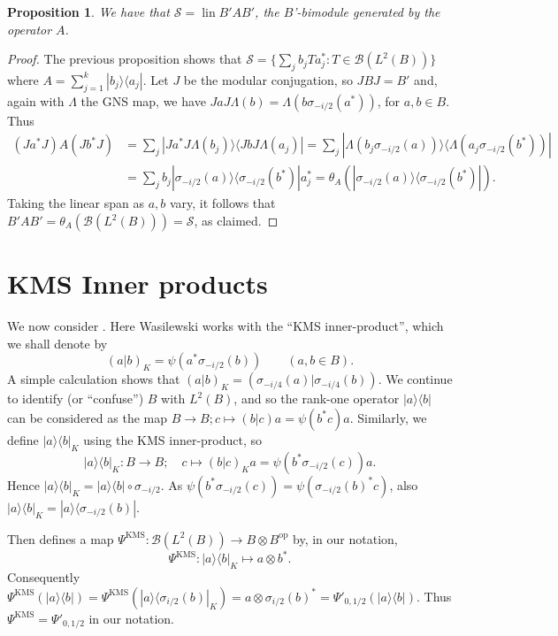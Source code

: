 \documentclass[a4paper,11pt]{article}
\theoremstyle{plain}
\newtheorem{proposition}{Proposition}[section]
\theoremstyle{remark}
\newcommand{\mc}[1]{\mathcal{#1}}
\newcommand{\lin}{\operatorname{lin}}
\newcommand{\op}{{\operatorname{op}}}
\newcommand{\KMS}{\textrm{KMS}}
\begin{document}
\begin{proposition}\label{prop:S_is_bimod_A}
We have that $\mc S = \lin B' A B'$, the $B$'-bimodule generated by the operator $A$.
\end{proposition}
\begin{proof}
The previous proposition shows that $\mc S = \{ \sum_j b_j T a_j^* : T\in\mc B(L^2(B)) \}$ where $A = \sum_{j=1}^k | b_j \rangle \langle a_j |$.  Let $J$ be the modular conjugation, so $JBJ = B'$ and, again with $\Lambda$ the GNS map, we have $JaJ \Lambda(b) = \Lambda(b \sigma_{-i/2}(a^*))$, for $a,b\in B$.  Thus
\begin{align*}
(Ja^*J) A (Jb^*J)
&= \sum_j | Ja^*J\Lambda(b_j) \rangle \langle JbJ \Lambda(a_j) |
= \sum_j | \Lambda(b_j \sigma_{-i/2}(a)) \rangle \langle \Lambda(a_j \sigma_{-i/2}(b^*)) | \\
&= \sum_j b_j |\sigma_{-i/2}(a)\rangle\langle \sigma_{-i/2}(b^*)| a_j^*
= \theta_A(|\sigma_{-i/2}(a)\rangle\langle \sigma_{-i/2}(b^*)|).
\end{align*}
Taking the linear span as $a,b$ vary, it follows that $B' A B' = \theta_A(\mc B(L^2(B))) = \mc S$, as claimed.
\end{proof}



\section{KMS Inner products}

We now consider \cite{Wasilewski_Quantum_Cayley}.  Here Wasilewski works with the ``KMS inner-product'', which we shall denote by
\begin{equation}
(a|b)_K = \psi(a^* \sigma_{-i/2}(b)) \qquad (a,b\in B).
\label{eq:KMS_defn}
\end{equation}
A simple calculation shows that $(a|b)_K = (\sigma_{-i/4}(a)|\sigma_{-i/4}(b))$.  We continue to identify (or ``confuse'') $B$ with $L^2(B)$, and so the rank-one operator $|a\rangle\langle b|$ can be considered as the map $B\to B; c \mapsto (b|c) a = \psi(b^*c) a$.  Similarly, we define $|a\rangle\langle b|_K$ using the KMS inner-product, so
\[ |a\rangle\langle b|_K \colon B \to B; \quad c \mapsto (b|c)_K a =  \psi(b^* \sigma_{-i/2}(c)) a. \]
Hence $|a\rangle\langle b|_K = |a\rangle\langle b| \circ \sigma_{-i/2}$.  As $\psi(b^* \sigma_{-i/2}(c)) = \psi(\sigma_{-i/2}(b)^* c)$, also $|a\rangle\langle b|_K = |a\rangle\langle\sigma_{-i/2}(b)|$.

Then \cite[Lemma~3.3]{Wasilewski_Quantum_Cayley} defines a map $\Psi^{\KMS} \colon \mc B(L^2(B)) \to B\otimes B^\op$ by, in our notation,
\[ \Psi^{\KMS} \colon  |a\rangle\langle b|_K  \mapsto  a \otimes b^*. \]
Consequently $\Psi^{\KMS}(|a\rangle\langle b|) = \Psi^{\KMS}(|a\rangle\langle \sigma_{i/2}(b)|_K)= a \otimes \sigma_{i/2}(b)^* = \Psi'_{0, 1/2}(|a\rangle\langle b|)$.  Thus $\Psi^{\KMS} = \Psi'_{0,1/2}$ in our notation.
\end{document}

